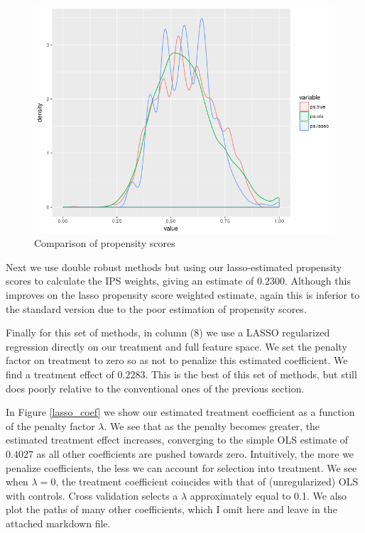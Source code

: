 \documentclass[paper=letter, fontsize=11pt]{scrartcl} %
\begin{document}
\begin{figure}[!ht]
\center
\caption{Comparison of propensity scores  \label{pscore}}
\includegraphics[scale=0.8]{pscore_ests.png}
\end{figure}

Next we use double robust methods but using our lasso-estimated propensity scores to calculate the IPS weights, giving an estimate of $0.2300$. Although this improves on the lasso propensity score weighted estimate, again this is inferior to the standard version due to the poor estimation of propensity scores.

Finally for this set of methods, in column (8) we use a LASSO regularized regression directly on our treatment and full feature space. We set the penalty factor on treatment to zero so as not to penalize this estimated coefficient. We find a treatment effect of $0.2283$.  This is the best of this set of methods, but still does poorly relative to the conventional ones of the previous section.

In Figure \ref{lasso_coef} we show our estimated treatment coefficient as a function of the penalty factor $\lambda$. We see that as the penalty becomes greater, the estimated treatment effect increases, converging to the simple OLS estimate of $0.4027$ as all other coefficients are pushed towards zero. Intuitively, the more we penalize coefficients, the less we can account for selection into treatment. We see when $\lambda=0$, the treatment coefficient coincides with that of (unregularized) OLS with controls. Cross validation selects a $\lambda$ approximately equal to 0.1. We also plot the paths of many other coefficients, which I omit here and leave in the attached markdown file.
\end{document}
